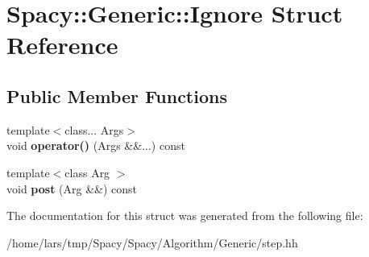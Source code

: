 \hypertarget{structSpacy_1_1Generic_1_1Ignore}{}\section{Spacy\+:\+:Generic\+:\+:Ignore Struct Reference}
\label{structSpacy_1_1Generic_1_1Ignore}
\subsection*{Public Member Functions}
\begin{DoxyCompactItemize}
\item 
{\footnotesize template$<$class... Args$>$ }\\void {\bfseries operator()} (Args \&\&...) const \hypertarget{structSpacy_1_1Generic_1_1Ignore_ac12f69ea973294c5d25f24d1a7d2f50b}{}\label{structSpacy_1_1Generic_1_1Ignore_ac12f69ea973294c5d25f24d1a7d2f50b}

\item 
{\footnotesize template$<$class Arg $>$ }\\void {\bfseries post} (Arg \&\&) const \hypertarget{structSpacy_1_1Generic_1_1Ignore_a1e9c15cacc52b4da38ad4745b275acb9}{}\label{structSpacy_1_1Generic_1_1Ignore_a1e9c15cacc52b4da38ad4745b275acb9}

\end{DoxyCompactItemize}


The documentation for this struct was generated from the following file\+:\begin{DoxyCompactItemize}
\item 
/home/lars/tmp/\+Spacy/\+Spacy/\+Algorithm/\+Generic/step.\+hh\end{DoxyCompactItemize}
